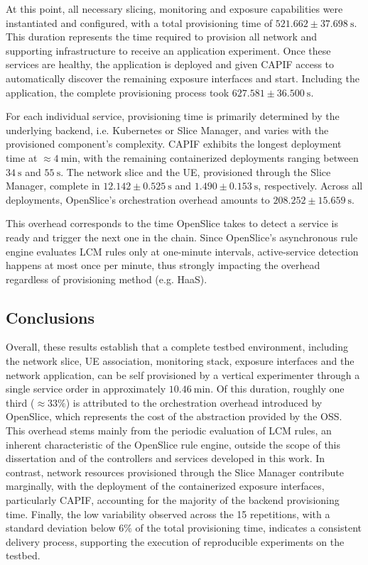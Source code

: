 At this point, all necessary slicing, monitoring and exposure capabilities were instantiated and configured, with a total provisioning time of $521.662 \pm 37.698\ \mathrm{s}$. This duration represents the time required to provision all network and supporting infrastructure to receive an application experiment. Once these services are healthy, the application is deployed and given \acs{CAPIF} access to automatically discover the remaining exposure interfaces and start. Including the application, the complete provisioning process took $627.581 \pm 36.500\ \mathrm{s}$.

For each individual service, provisioning time is primarily determined by the underlying backend, i.e. Kubernetes or Slice Manager, and varies with the provisioned component's complexity. \acs{CAPIF} exhibits the longest deployment time at $\approx 4~\mathrm{min}$, with the remaining containerized deployments ranging between $34\ \mathrm{s}$ and $55\ \mathrm{s}$. The network slice and the \acs{UE}, provisioned through the Slice Manager, complete in $12.142 \pm 0.525\ \mathrm{s}$ and $1.490 \pm 0.153\ \mathrm{s}$, respectively. Across all deployments, OpenSlice's orchestration overhead amounts to $208.252 \pm 15.659\ \mathrm{s}$.

This overhead corresponds to the time OpenSlice takes to detect a service is ready and trigger the next one in the chain. Since OpenSlice's asynchronous rule engine evaluates \acs{LCM} rules only at one-minute intervals, active-service detection happens at most once per minute, thus strongly impacting the overhead regardless of provisioning method (e.g. \acs{HaaS}).

\subsection{Conclusions}
\label{chap:results:delivery:conclusion}

Overall, these results establish that a complete testbed environment, including the network slice, \acs{UE} association, monitoring stack, exposure interfaces and the network application, can be self provisioned by a vertical experimenter through a single service order in approximately $10.46\ \mathrm{min}$. Of this duration, roughly one third ($\approx 33\%$) is attributed to the orchestration overhead introduced by OpenSlice, which represents the cost of the abstraction provided by the \acs{OSS}. This overhead stems mainly from the periodic evaluation of \acs{LCM} rules, an inherent characteristic of the OpenSlice rule engine, outside the scope of this dissertation and of the controllers and services developed in this work. In contrast, network resources provisioned through the Slice Manager contribute marginally, with the deployment of the containerized exposure interfaces, particularly \acs{CAPIF}, accounting for the majority of the backend provisioning time. Finally, the low variability observed across the 15 repetitions, with a standard deviation below $6\%$ of the total provisioning time, indicates a consistent delivery process, supporting the execution of reproducible experiments on the testbed.
